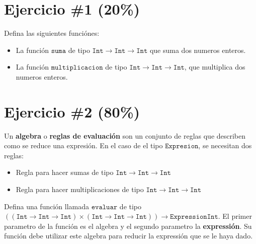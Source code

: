 \documentclass{article}
\begin{document}
\section*{Ejercicio \#1 (20\%)}
Defina las siguientes funci\'ones:
\begin{itemize}
        \item{La funci\'on $\mathtt{suma}$ de tipo $\mathtt{Int}\rightarrow\mathtt{Int}
        \rightarrow\mathtt{Int}$ que suma dos numeros enteros.}
        \item{La funci\'on $\mathtt{multiplicacion}$ de tipo $\mathtt{Int}\rightarrow\mathtt{Int}
        \rightarrow\mathtt{Int}$, que multiplica dos numeros enteros.}
\end{itemize}


\section*{Ejercicio \#2 (80\%)}

Un {\bf algebra} o {\bf reglas de evaluaci\'on} son un conjunto de reglas que describen como
se reduce una expresi\'on. En el caso de el tipo $\mathtt{Expresion}$, se necesitan dos reglas:
\begin{itemize}
        \item{Regla para hacer sumas de tipo $\mathtt{Int}\rightarrow\mathtt{Int}
        \rightarrow\mathtt{Int}$}
        \item{Regla para hacer multiplicaciones de tipo $\mathtt{Int}\rightarrow\mathtt{Int}
        \rightarrow\mathtt{Int}$}
\end{itemize}

Defina una funci\'on llamada $\mathtt{evaluar}$ de tipo $\mathtt{((Int\rightarrow Int\rightarrow Int)\times
(\mathtt{Int}\rightarrow\mathtt{Int}\rightarrow\mathtt{Int}))}\rightarrow \mathtt{Expression} \mathtt{Int}$.
El primer parametro de la funci\'on es el algebra y el segundo parametro la {\bf expressi\'on}. Su
funci\'on debe utilizar este algebra para reducir la expressi\'on que se le haya dado.
\end{document}

